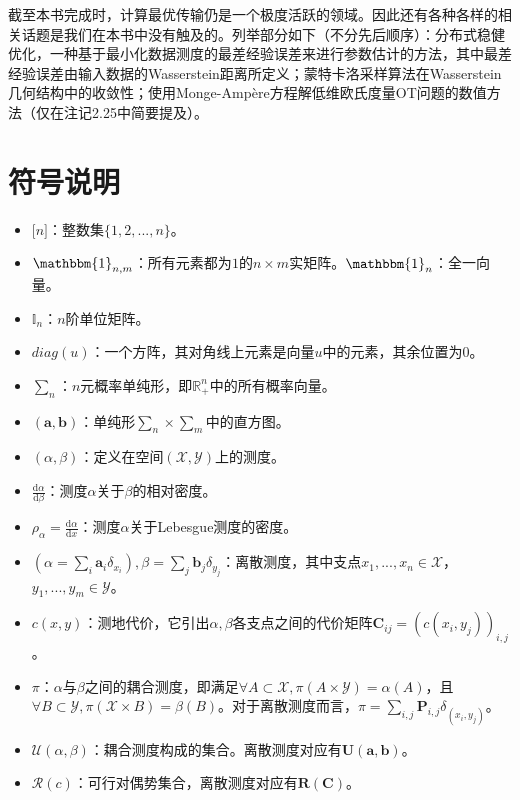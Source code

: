 \documentclass[cn,10pt,math=newtx,citestyle=gb7714-2015,bibstyle=gb7714-2015]{elegantbook}
\begin{document}
截至本书完成时，计算最优传输仍是一个极度活跃的领域。因此还有各种各样的相关话题是我们在本书中没有触及的。列举部分如下（不分先后顺序）：分布式稳健优化，一种基于最小化数据测度的最差经验误差来进行参数估计的方法，其中最差经验误差由输入数据的Wasserstein距离所定义；蒙特卡洛采样算法在Wasserstein几何结构中的收敛性；使用Monge-Amp\`ere方程解低维欧氏度量OT问题的数值方法（仅在注记2.25中简要提及）。

\newpage

\section{符号说明}

\begin{itemize}
    \item $\mathbb{[}n\mathbb{]}$：整数集$\{1,2,...,n\}$。
    \item $\mathbbm{1}_{n,m}$：所有元素都为$1$的$n\times m$实矩阵。$\mathbbm{1}_n$：全一向量。
    \item $\mathbb{I}_n$：$n$阶单位矩阵。
    \item $diag(u)$：一个方阵，其对角线上元素是向量$u$中的元素，其余位置为$0$。
    \item $\sum_n$：$n$元概率单纯形，即$\mathbb{R}_+^{n}$中的所有概率向量。
    \item $(\mathbf{a,b})$：单纯形$\sum_n\times \sum_m$中的直方图。
    \item $(\alpha,\beta)$：定义在空间$(\mathcal{X,Y})$上的测度。
    \item $\frac{\text{d}\alpha}{\text{d}\beta}$：测度$\alpha$关于$\beta$的相对密度。
    \item $\rho_\alpha=\frac{\text{d}\alpha}{\text{d} x}$：测度$\alpha$关于Lebesgue测度的密度。
    \item $(\alpha=\sum_i \mathbf{a}_i\delta_{x_i}),\beta=\sum_j \mathbf{b}_j \delta_{y_j}$：离散测度，其中支点$x_1,...,x_n\in \mathcal{X}$，$y_1,...,y_m\in \mathcal{Y}$。
    \item $c(x,y)$：测地代价，它引出$\alpha,\beta$各支点之间的代价矩阵$\mathbf{C}_{ij}=(c(x_i,y_j))_{i,j}$。
    \item $\pi$：$\alpha$与$\beta$之间的耦合测度，即满足$\forall A\subset \mathcal{X},\pi(A\times \mathcal{Y})=\alpha(A)$，且$\forall B\subset \mathcal{Y},\pi(\mathcal{X} \times B)=\beta(B)$。对于离散测度而言，$\pi=\sum_{i,j}\mathbf{P}_{i,j}\delta_{(x_i,y_j)}$。
    \item $\mathcal{U}(\alpha,\beta)$：耦合测度构成的集合。离散测度对应有$\mathbf{U(a,b)}$。
    \item $\mathcal{R}(c)$：可行对偶势集合，离散测度对应有$\mathbf{R(C)}$。

\end{itemize}
\end{document}
